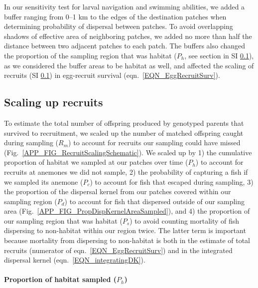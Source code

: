 \documentclass[12pt, oneside]{article}   	%
\begin{document}
In our sensitivity test for larval navigation and swimming abilities, we added a buffer ranging from 0--1 km to the edges of the destination patches when determining probability of dispersal between patches. To avoid overlapping shadows of effective area of neighboring patches, we added no more than half the distance between two adjacent patches to each patch. The buffers also changed the proportion of the sampling region that was habitat ($P_h$, see section in SI \ref{APP_SEC_METHODS_ScalingUpRecruits}), as we considered the buffer areas to be habitat as well, and affected the scaling of recruits (SI \ref{APP_SEC_METHODS_ScalingUpRecruits}) in egg-recruit survival (eqn.\ \ref{EQN_EggRecruitSurv}).

\subsection{Scaling up recruits} \label{APP_SEC_METHODS_ScalingUpRecruits}

To estimate the total number of offspring produced by genotyped parents that survived to recruitment, we scaled up the number of matched offspring caught during sampling ($R_m$) to account for recruits our sampling could have missed (Fig.\ \ref{APP_FIG_RecruitScalingSchematic}). We scaled up by 1) the cumulative proportion of habitat we sampled at our patches over time ($P_h$) to account for recruits at anemones we did not sample, 2) the probability of capturing a fish if we sampled its anemone ($P_c$) to account for fish that escaped during sampling, 3) the proportion of the dispersal kernel from our patches covered within our sampling region ($P_d$) to account for fish that dispersed outside of our sampling area (Fig.\ \ref{APP_FIG_PropDispKernelAreaSampled}), and 4) the proportion of our sampling region that was habitat ($P_s$) to avoid counting mortality of fish dispersing to non-habitat within our region twice. The latter term is important because mortality from dispersing to non-habitat is both in the estimate of total recruits (numerator of eqn.\ \ref{EQN_EggRecruitSurv}) and in the integrated dispersal kernel (eqn.\ \ref{EQN_integratingDK}). %

\paragraph*{Proportion of habitat sampled ($P_h$)} %
\end{document}
